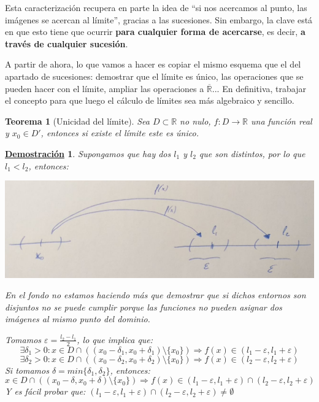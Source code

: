 \documentclass[10pt,a4paper,openright]{book}
\theoremstyle{break}
\newtheorem{theo}{Teorema}[chapter]
\newtheorem*{demo}{\underline{Demostración}}
\begin{document}
Esta caracterización recupera en parte la idea de ``si nos acercamos al punto, las imágenes se acercan al límite'', gracias a las sucesiones. Sin embargo, la clave está en que esto tiene que ocurrir \textbf{para cualquier forma de acercarse}, es decir, \textbf{a través de cualquier sucesión}.

A partir de ahora, lo que vamos a hacer es copiar el mismo esquema que el del apartado  de sucesiones: demostrar que el límite es único, las operaciones que se pueden hacer con el límite, ampliar las operaciones a $\overline{\mathbb{R}}$... En definitiva, trabajar el concepto para que luego el cálculo de límites sea más algebraico y sencillo.

\begin{theo}[Unicidad del límite]
Sea $D\subset \mathbb R$ no nulo, $f:D\longrightarrow \mathbb R$ una función real y $x_0\in D'$, entonces si existe el límite este es único.
\end{theo}
\begin{demo}
Supongamos que hay dos $l_1$ y $l_2$ que son distintos, por lo que $l_1<l_2$, entonces:

\begin{center}
\includegraphics[scale=0.30]{limite doble}
\end{center}

En el fondo no estamos haciendo más que demostrar que si dichos entornos son disjuntos no se puede cumplir porque las funciones no pueden asignar dos imágenes al mismo punto del dominio.

Tomamos $\varepsilon=\frac{l_2-l_1}{2}$, lo que implica que:
$$\exists \delta_1>0: x\in D\cap \left((x_0-\delta_1, x_0+\delta_1)\mbox{\textbackslash}\{x_0\}\right) \Rightarrow f(x)\in (l_1-\varepsilon, l_1+\varepsilon)$$
$$\exists \delta_2>0: x\in D\cap \left((x_0-\delta_2, x_0+\delta_2)\mbox{\textbackslash}\{x_0\}\right) \Rightarrow f(x)\in (l_2-\varepsilon, l_2+\varepsilon)$$
Si tomamos $\delta=min\{\delta_1, \delta_2\}$, entonces:
$$x\in D\cap \left((x_0-\delta, x_0+\delta)\mbox{\textbackslash}\{x_0\}\right) \Rightarrow f(x)\in (l_1-\varepsilon, l_1+\varepsilon)\cap (l_2-\varepsilon, l_2+\varepsilon)$$
Y es fácil probar que: $(l_1-\varepsilon, l_1+\varepsilon)\cap (l_2-\varepsilon, l_2+\varepsilon)\neq \emptyset$
\end{demo}
\end{document}
